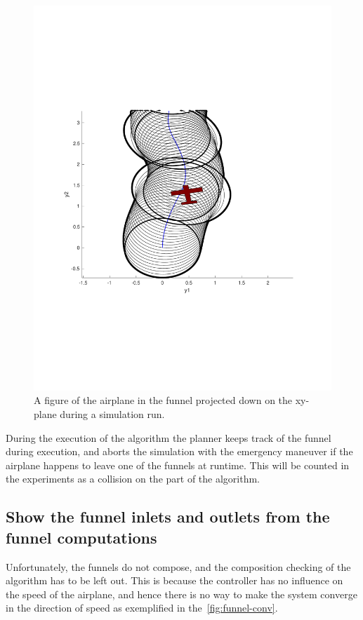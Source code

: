 \begin{figure}
  \centering \includegraphics[scale=.5]{figures/experiments/airplane-in-funnel}
  \caption{A figure of the airplane in the funnel projected down on the xy-plane
    during a simulation run.}
\end{figure}

During the execution of the \rrtfunnel{} algorithm the planner keeps track of
the funnel during execution, and aborts the simulation with the emergency
maneuver if the airplane happens to leave one of the funnels at runtime. This
will be counted in the experiments as a collision on the part of the
\rrtfunnel{} algorithm.

\subsection{Show the funnel inlets and outlets from the funnel computations}
\label{subsec:funnel-no-composable}

Unfortunately, the funnels do not compose, and the composition checking of the
algorithm has to be left out. This is because the controller has no influence on
the speed of the airplane, and hence there is no way to make the system converge
in the direction of speed as exemplified in the~\cref{fig:funnel-conv}.

